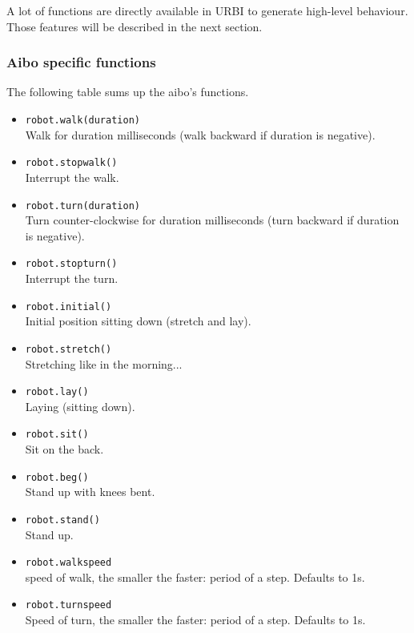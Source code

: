  A lot of functions are directly available in URBI to generate
high-{}level behaviour. Those features will be described in the
next section.


\subsubsection{Aibo specific functions}
\label{webots.builtin.robots.aibo}%

 The following table sums up the aibo's functions.

\begin{itemize}
\item \lstinline|robot.walk(duration)|\\
  Walk for duration milliseconds (walk backward if duration is negative).
\item \lstinline|robot.stopwalk()|\\
  Interrupt the walk.
\item \lstinline|robot.turn(duration)|\\
  Turn counter-clockwise for duration milliseconds (turn backward if duration is negative).
\item \lstinline|robot.stopturn()|\\
  Interrupt the turn.
\item \lstinline|robot.initial()|\\
  Initial position sitting down (stretch and lay).
\item \lstinline|robot.stretch()|\\
  Stretching like in the morning...
\item \lstinline|robot.lay()|\\
  Laying (sitting down).
\item \lstinline|robot.sit()|\\
  Sit on the back.
\item \lstinline|robot.beg()|\\
  Stand up with knees bent.
\item \lstinline|robot.stand()|\\
  Stand up.
\end{itemize}

\begin{itemize}
\item \lstinline|robot.walkspeed|\\
  speed of walk, the smaller the faster: period of a step. Defaults to
  1s.
\item \lstinline|robot.turnspeed|\\
  Speed of turn, the smaller the faster: period of a step. Defaults to
  1s.
\end{itemize}

